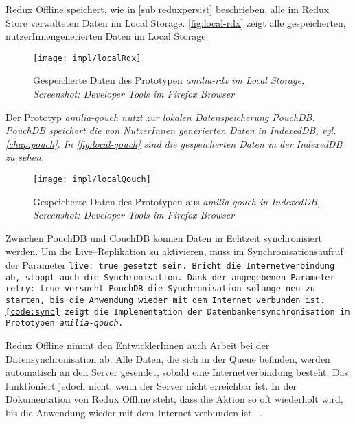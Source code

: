 %
%
Redux Offline speichert, wie in \autoref{sub:reduxpersist} beschrieben, alle im Redux Store verwalteten Daten im Local Storage.
\autoref{fig:local-rdx} zeigt alle gespeicherten, nutzerInnengenerierten Daten im Local Storage.
%
\begin{figure}[H]
  \centering
  \texttt{[image: impl/localRdx]}
  \grayRule
  \caption[Gespeicherte Daten im Local Storage]{Gespeicherte Daten des Prototypen \it{amilia-rdx} im Local Storage,\\Screenshot: Developer Tools im Firefox Browser}
  \label{fig:local-rdx}
\end{figure}
% 
Der Prototyp \it{amilia-qouch} nutzt zur lokalen Datenspeicherung PouchDB. PouchDB speichert die von NutzerInnen generierten Daten in IndexedDB, vgl. \autoref{chap:pouch}. In \autoref{fig:local-qouch} sind die gespeicherten Daten in der IndexedDB zu sehen.
%
\begin{figure}[H]
  \centering
  \texttt{[image: impl/localQouch]}
  \grayRule
  \caption[Gespeicherte Daten in IndexedDB]{Gespeicherte Daten des Prototypen aus \it{amilia-qouch} in IndexedDB,\\Screenshot: Developer Tools im Firefox Browser}
  \label{fig:local-qouch}
\end{figure}
%
%
Zwischen PouchDB und CouchDB können Daten in Echtzeit synchronisiert werden.
Um die Live--Replikation zu aktivieren, muss im Synchronisationsaufruf der Parameter \tt{live: true} gesetzt sein.
Bricht die Internetverbindung ab, stoppt auch die Synchronisation.
Dank der angegebenen Parameter \tt{retry: true} versucht PouchDB die Synchronisation solange neu zu starten, bis die Anwendung wieder mit dem Internet verbunden ist. \autoref{code:sync} zeigt die Implementation der Datenbankensynchronisation im Prototypen \it{amilia-qouch}.
%
\begin{center}
  
\end{center}
% 
Redux Offline nimmt den EntwicklerInnen auch Arbeit bei der Datensynchronisation ab.
Alle Daten, die sich in der Queue befinden, werden automatisch an den Server gesendet, sobald eine Internetverbindung besteht.
Das funktioniert jedoch nicht, wenn der Server nicht erreichbar ist.
In der Dokumentation von Redux Offline steht, dass die Aktion so oft wiederholt wird, bis die Anwendung wieder mit dem Internet verbunden ist ~\cite{giving-up}.
